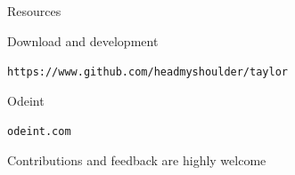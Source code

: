 \documentclass{beamer}
\begin{document}
\begin{frame}[fragile]{Resources}

Download and development

{\tt https://www.github.com/headmyshoulder/taylor}

\vspace{2ex}

Odeint 

{\tt odeint.com}

\vspace{4ex}

\begin{block}{Contributions and feedback}
 are highly welcome
\end{block}

\end{frame}
\end{document}
